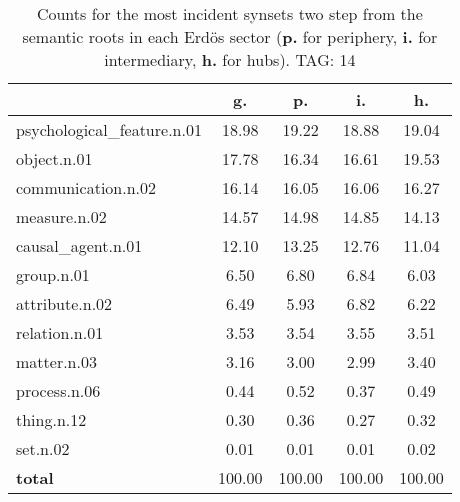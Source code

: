 \begin{table}[h!]
\begin{center}
\begin{tabular}{| l || c | c | c | c |}\hline
 & {\bf g.} & {\bf p.} & {\bf i.} & {\bf h.} \\\hline\hline
psychological\_feature.n.01 & 18.98  & 19.22  & 18.88  & 19.04 \\\hline
object.n.01 & 17.78  & 16.34  & 16.61  & 19.53 \\\hline
communication.n.02 & 16.14  & 16.05  & 16.06  & 16.27 \\\hline
measure.n.02 & 14.57  & 14.98  & 14.85  & 14.13 \\\hline
causal\_agent.n.01 & 12.10  & 13.25  & 12.76  & 11.04 \\\hline
group.n.01 & 6.50  & 6.80  & 6.84  & 6.03 \\\hline
attribute.n.02 & 6.49  & 5.93  & 6.82  & 6.22 \\\hline
relation.n.01 & 3.53  & 3.54  & 3.55  & 3.51 \\\hline
matter.n.03 & 3.16  & 3.00  & 2.99  & 3.40 \\\hline
process.n.06 & 0.44  & 0.52  & 0.37  & 0.49 \\\hline
thing.n.12 & 0.30  & 0.36  & 0.27  & 0.32 \\\hline
set.n.02 & 0.01  & 0.01  & 0.01  & 0.02 \\\hline\hline
{{\bf total}} & 100.00  & 100.00  & 100.00  & 100.00 \\\hline
\end{tabular}
\caption{Counts for the most incident synsets two step from the semantic roots in each Erd\"os sector ({\bf p.} for periphery, {\bf i.} for intermediary, {\bf h.} for hubs). TAG: 14}
\end{center}
\end{table}